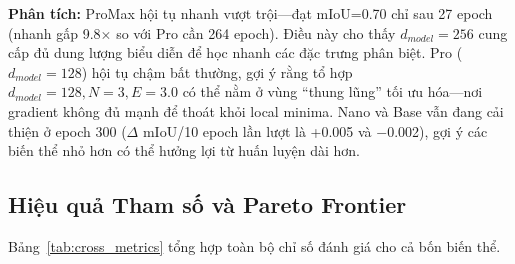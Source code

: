 \documentclass[conference]{IEEEtran}
\begin{document}
\begin{table}[t]
\centering
\caption{Tốc độ hội tụ: số epoch để đạt ngưỡng mIoU}
\label{tab:convergence_speed}
\end{table}

\noindent \textbf{Phân tích:} ProMax hội tụ nhanh vượt trội---đạt mIoU=0.70 chỉ sau 27 epoch (nhanh gấp 9.8$\times$ so với Pro cần 264 epoch). Điều này cho thấy $d_{model}=256$ cung cấp đủ dung lượng biểu diễn để học nhanh các đặc trưng phân biệt. Pro ($d_{model}=128$) hội tụ chậm bất thường, gợi ý rằng tổ hợp $d_{model}=128, N=3, E=3.0$ có thể nằm ở vùng ``thung lũng'' tối ưu hóa---nơi gradient không đủ mạnh để thoát khỏi local minima. Nano và Base vẫn đang cải thiện ở epoch 300 ($\Delta$ mIoU/10 epoch lần lượt là +0.005 và $-$0.002), gợi ý các biến thể nhỏ hơn có thể hưởng lợi từ huấn luyện dài hơn.

\subsection{Hiệu quả Tham số và Pareto Frontier}

Bảng~\ref{tab:cross_metrics} tổng hợp toàn bộ chỉ số đánh giá cho cả bốn biến thể.
\end{document}
